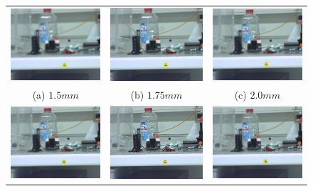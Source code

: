 \documentclass[
a4paper,     %
12pt         %
]{scrartcl}  %
\begin{document}
\begin{figure}
\centering
\begin{tabular}{ccc}
 \includegraphics[width=48mm]{./Bildg_Messtechnik_Lab/Autofokus/images/image_01_5.png} & \includegraphics[width=48mm]{./Bildg_Messtechnik_Lab/Autofokus/images/image_01_75.png} & \includegraphics[width=48mm]{./Bildg_Messtechnik_Lab/Autofokus/images/image_02_0.png}\\
(a) $1.5mm$ & (b) $1.75mm$ & (c) $2.0mm$\\[6pt]
 \includegraphics[width=48mm]{./Bildg_Messtechnik_Lab/Autofokus/images/image_02_5.png} & \includegraphics[width=48mm]{./Bildg_Messtechnik_Lab/Autofokus/images/image_03.png} & \includegraphics[width=48mm]{./Bildg_Messtechnik_Lab/Autofokus/images/image_04.png}\\

\end{tabular}
\end{figure}
\end{document}
